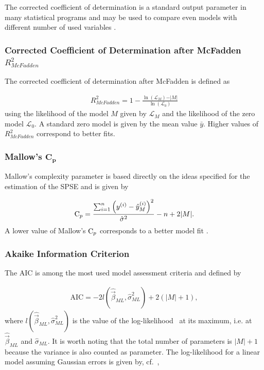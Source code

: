 The corrected coefficient of determination is a standard output parameter in many statistical programs and may be used to compare even models with different number of used variables \cite{fahrmeir2007regression}.

\subsubsection{Corrected Coefficient of Determination after McFadden $R_{McFadden}^2$}

The corrected coefficient of determination after McFadden is defined as

\begin{align}
	R_{McFadden}^2 = 1 - \frac{\ln{(\mathcal{L}_M)} - \vert M \vert }{\ln{(\mathcal{L}_0)}}
\end{align}
%
using the likelihood of the model $M$ given by $\mathcal{L}_M$ and the likelihood of the zero model $\mathcal{L}_0$. A standard zero model is given by the mean value $\bar y$. Higher values of $R_{McFadden}^2$ correspond to better fits.

\subsubsection{Mallow's $\mathbf{C_p}$}

Mallow's complexity parameter is based directly on the ideas specified for the estimation of the SPSE and is given by

\begin{align}
	\text C_p = \frac{\sum_{i=1}^n \left(y^{(i)} - \hat y^{(i)}_M\right)^2}{\hat \sigma^2} - n + 2 \vert M \vert.
\end{align}
%
A lower value of Mallow's $\text C_p$ corresponds to a better model fit \cite{fahrmeir2007regression}.

\subsubsection{Akaike Information Criterion}

The AIC is among the most used model assessment criteria and defined by

\begin{align}
	\text{AIC} = -2 l(\hat{\vec{\beta}}_{ML}, \hat \sigma^2_{ML}) + 2(\vert M \vert +1),
\end{align}
%
where $l(\hat{\vec{\beta}}_{ML}, \hat \sigma^2_{ML})$ is the value of the log-likelihood~ at its maximum, i.e. at $\hat{\vec{\beta}}_{ML}$ and $\hat{\sigma}_{ML}$. It is worth noting that the total number of parameters is $\vert M \vert + 1$ because the variance is also counted as parameter. The log-likelihood for a linear model assuming Gaussian errors is given by, cf.~,

